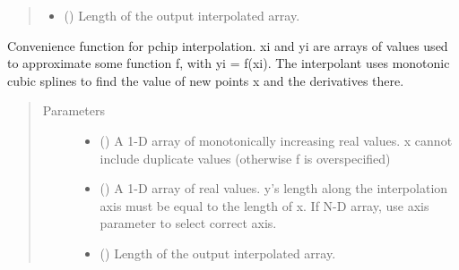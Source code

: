 \documentclass[letterpaper,10pt,english,openany, oneside]{sphinxmanual}
\begin{document}
\begin{fulllineitems}
\begin{quote}
\begin{description}
\begin{itemize}
\item {} 
 () \textendash{} Length of the output interpolated array.

\end{itemize}

\end{description}\end{quote}

\begin{fulllineitems}
\label{\detokenize{index:fompy.conditioning.interpolator.pchip_interpol}}
Convenience function for pchip interpolation. xi and yi are arrays of
values used to approximate some function f, with yi = f(xi).
The interpolant uses monotonic cubic splines to find the value of
new points x and the derivatives there.

\end{fulllineitems}

\begin{quote}\begin{description}
\item[{Parameters}] \leavevmode\begin{itemize}
\item {} 
 (\sphinxstyleliteralemphasis{\sphinxupquote{, }}\sphinxstyleliteralemphasis{\sphinxupquote{ (}}\sphinxstyleliteralemphasis{\sphinxupquote{,}}\sphinxstyleliteralemphasis{\sphinxupquote{)}}) \textendash{} A 1-D array of monotonically increasing real values.
x cannot include duplicate values (otherwise f is overspecified)

\item {} 
 () \textendash{} A 1-D array of real values. y’s length along
the interpolation axis must be equal to the length
of x. If N-D array, use axis parameter to select correct axis.

\item {} 
 () \textendash{} Length of the output interpolated array.


\end{itemize}
\end{description}
\end{quote}
\end{fulllineitems}
\end{document}
